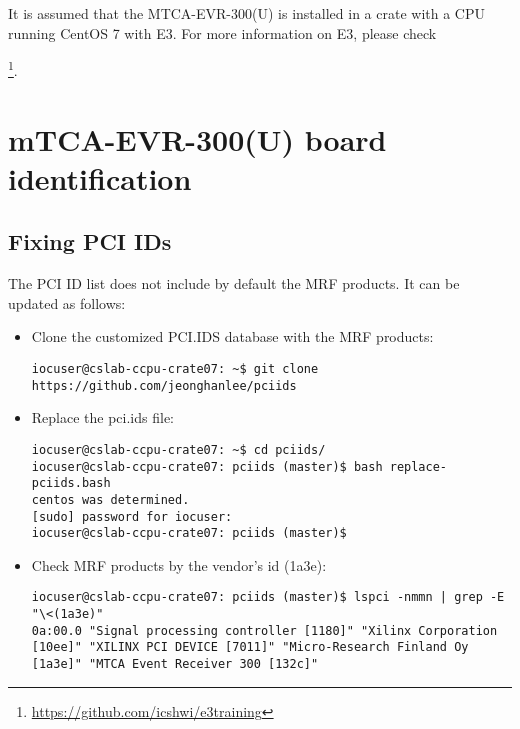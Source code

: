 \documentclass[11pt
  , a4paper
  , article
  , oneside
  , showtrims
]{memoir}
\begin{document}
It is assumed that the MTCA-EVR-300(U) is installed in a crate with a CPU running CentOS 7 with E3. For more information on E3, please check {\footnote{\url{https://github.com/icshwi/e3training}}.\\


\section{mTCA-EVR-300(U) board identification}

\subsection{Fixing PCI IDs}
The PCI ID list does not include by default the MRF products. It can be updated as follows:
\begin{itemize}
\item Clone the customized PCI.IDS database with the MRF products:
\begin{lstlisting}[style=termstyle]
iocuser@cslab-ccpu-crate07: ~$ git clone https://github.com/jeonghanlee/pciids
\end{lstlisting}
\item Replace the pci.ids file:
\begin{lstlisting}[style=termstyle]
iocuser@cslab-ccpu-crate07: ~$ cd pciids/
iocuser@cslab-ccpu-crate07: pciids (master)$ bash replace-pciids.bash
centos was determined.
[sudo] password for iocuser:
iocuser@cslab-ccpu-crate07: pciids (master)$
\end{lstlisting}
\item Check MRF products by the vendor's id (1a3e):
\begin{lstlisting}[style=termstyle]
iocuser@cslab-ccpu-crate07: pciids (master)$ lspci -nmmn | grep -E "\<(1a3e)"
0a:00.0 "Signal processing controller [1180]" "Xilinx Corporation [10ee]" "XILINX PCI DEVICE [7011]" "Micro-Research Finland Oy [1a3e]" "MTCA Event Receiver 300 [132c]"
\end{lstlisting}
\end{itemize}

}
\end{document}
